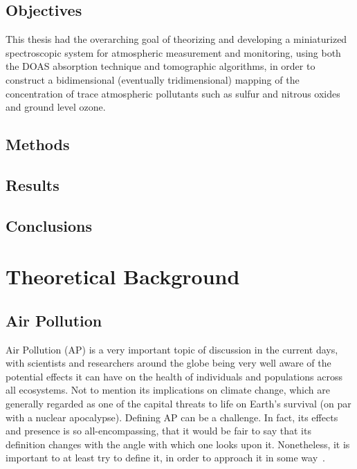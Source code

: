 \subsection{Objectives}%
\label{sub:objectives}

This thesis had the overarching goal of theorizing and developing a
miniaturized spectroscopic system for atmospheric measurement and
monitoring, using both the \gls{DOAS} absorption technique and
tomographic algorithms, in order to construct a bidimensional
(eventually tridimensional) mapping of the concentration of trace
atmospheric pollutants such as sulfur and nitrous oxides and ground
level ozone. 

\subsection{Methods}%
\label{sub:methods}

\subsection{Results}%
\label{sub:results}

\subsection{Conclusions}%
\label{sub:conclusions}

\section{Theoretical Background}%
\label{sec:theoretical_background}

\subsection{Air Pollution}%
\label{ssub:air_pollution}

Air Pollution (\gls{AP}) is a very important topic of discussion in the
current days, with scientists and researchers around the globe being
very well aware of the potential effects it can have on the health of
individuals and populations across all ecosystems. Not to mention its
implications on climate change, which are generally regarded as one of
the capital threats to life on Earth's survival (on par with a nuclear
apocalypse). Defining \gls{AP} can be a challenge. In fact, its effects
and presence is so all-encompassing, that it would be fair to say that
its definition changes with the angle with which one looks upon it.
Nonetheless, it is important to at least try to define it, in order to
approach it in some way~\cite{Lovett2009, Ghorani-Azam2016}.

